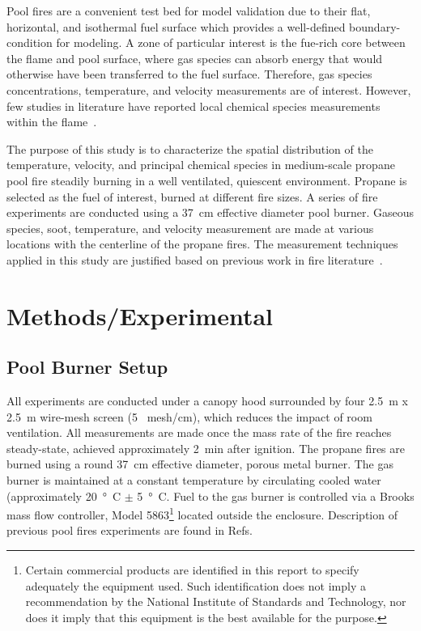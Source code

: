 \documentclass[12pt]{ussci}
\begin{document}
Pool fires are a convenient test bed for model validation due to their flat, horizontal, and isothermal fuel surface which provides a well-defined boundary-condition for modeling. A zone of particular interest is the fue-rich core between the flame and pool surface, where gas species can absorb energy that would otherwise have been transferred to the fuel surface. Therefore, gas species concentrations, temperature, and velocity measurements are of interest. However, few studies in literature have reported local chemical species measurements within the flame~\cite{Fisher1987,Hamins2016,Choi1995,andrews2005,meier2000,bundy2007,Lock2008,Falkenstein2021a,Falkenstein2020a,Falkenstein2020b,Falkenstein2021b,ORLOFF1988General,ORLOFF1987Chemical,smith1992major}. 

The purpose of this study is to characterize the spatial distribution of the temperature, velocity, and principal chemical species in medium-scale propane pool fire steadily burning in a well ventilated, quiescent environment. Propane is selected as the fuel of interest, burned at different fire sizes. A series of fire experiments are conducted using a 37~cm effective diameter pool burner. Gaseous species, soot, temperature, and velocity measurement are made at various locations with the centerline of the propane fires. The measurement techniques applied in this study are justified based on previous work in fire literature~\cite{Falkenstein2021c,Choi1995}.


\section{Methods/Experimental}
\subsection{Pool Burner Setup}
All experiments are conducted under a canopy hood surrounded by four 2.5~m x 2.5~m wire-mesh screen (5~ mesh/cm), which reduces the impact of room ventilation. All measurements are made once the mass rate of the fire reaches steady-state, achieved approximately 2~min after ignition. 
The propane fires are burned using a round 37~cm effective diameter, porous metal burner. The gas burner is maintained at a constant temperature by circulating cooled water (approximately \SI{20}{\degree C} $\pm$ \SI{5}{\degree C}. Fuel to the gas burner is controlled via a Brooks mass flow controller, Model 5863\footnote{\label{fn:product} Certain commercial products are identified in this report to specify adequately the equipment used. Such identification does not imply a recommendation by the National Institute of Standards and Technology, nor does it imply that this equipment is the best available for the purpose.} located outside the enclosure. Description of previous pool fires experiments are found in Refs.~\cite{Hamins2016,Hamins1994,Hamins1991,Hamins1996a,Hamins1996b,Lock2008}
\end{document}
